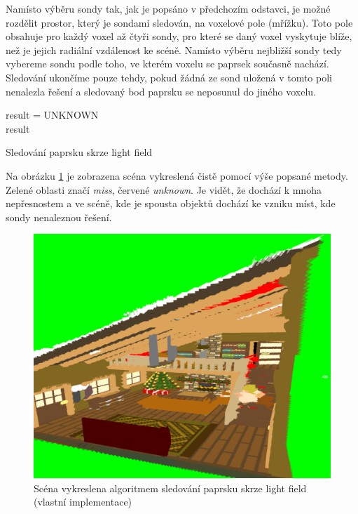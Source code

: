 Namísto výběru sondy tak, jak je popsáno v předchozím odstavci, je možné rozdělit prostor, který je sondami sledován, na voxelové pole (mřížku). Toto pole obsahuje pro každý voxel až čtyři sondy, pro které se daný voxel vyskytuje blíže, než je jejich radiální vzdálenost ke scéně. Namísto výběru nejbližší sondy tedy vybereme sondu podle toho, ve kterém voxelu se paprsek současně nachází. Sledování ukončíme pouze tehdy, pokud žádná ze sond uložená v tomto poli nenalezla řešení a sledovaný bod paprsku se neposunul do jiného voxelu. 

\begin{center}
	\begin{czechalgorithm}[H] \label{alg:light_field_trace}
	    result = UNKNOWN\\
	    \KwRet result
		\caption{Sledování paprsku skrze light field}
	\end{czechalgorithm}
\end{center}

Na obrázku \ref{fig:lfp_scene_render} je zobrazena scéna vykreslená čistě pomocí výše popsané metody. Zelené oblasti značí \textit{miss}, červené \textit{unknown}. Je vidět, že dochází k mnoha nepřesnostem a ve scéně, kde je spousta objektů dochází ke vzniku míst, kde sondy nenaleznou řešení.

\begin{figure}[H]
	\centering
	\includegraphics[scale=1]{images/probe_scene_render.png}
	\caption{Scéna vykreslena algoritmem sledování paprsku skrze light field (vlastní implementace)}
	\label{fig:lfp_scene_render}
\end{figure}


